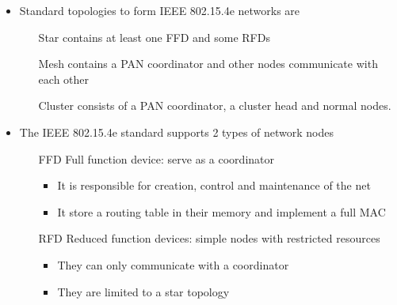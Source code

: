 \begin{itemize}
	\item Standard topologies to form IEEE 802.15.4e networks are 
		\begin{itemize}
			\item[Star] contains at least one FFD and some RFDs
			\item[Mesh] contains a PAN coordinator and other nodes communicate with each other
			\item[Cluster] consists of a PAN coordinator, a cluster head and normal nodes.
		\end{itemize}
			\item The IEEE 802.15.4e standard supports 2 types of network nodes
		\begin{itemize}
			\item[FFD] Full function device: serve as a coordinator
				\begin{itemize}
					\item It is responsible for creation, control and maintenance of the net
					\item It store a routing table in their memory and implement a full MAC
				\end{itemize}
			\item[RFD] Reduced function devices: simple nodes with restricted resources
				\begin{itemize}
					\item They can only communicate with a coordinator
					\item They are limited to a star topology
				\end{itemize}
			\end{itemize}
		\end{itemize}

